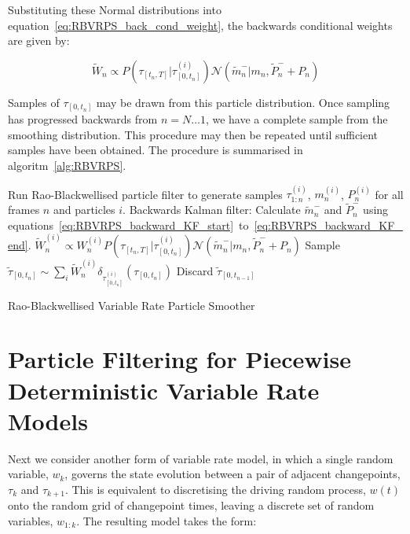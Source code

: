 \documentclass[a4paper,10pt]{article}
\begin{document}
Substituting these Normal distributions into equation~\ref{eq:RBVRPS_back_cond_weight}, the backwards conditional weights are given by:

\begin{equation}
 \tilde{W}_n \propto P(\tau_{[t_n,T]}|\tau_{[0,t_n]}^{(i)}) \mathcal{N}(\tilde{m}_n^-|m_n, \tilde{P}_n^- + P_n)
\label{eq:RBVRPS_back_cond_weight2}
\end{equation}

Samples of $\tau_{[0,t_n]}$ may be drawn from this particle distribution. Once sampling has progressed backwards from $n=N \dots 1$, we have a complete sample from the smoothing distribution. This procedure may then be repeated until sufficient samples have been obtained. The procedure is summarised in algoritm~\ref{alg:RBVRPS}.

\begin{algorithm}
 \begin{algorithmic}
  \STATE Run Rao-Blackwellised particle filter to generate samples $\tau_{1:n}^{(i)}$, $m_n^{(i)}$, $P_n^{(i)}$ for all frames $n$ and particles $i$.
      \STATE Backwards Kalman filter: Calculate $\tilde{m}_n^-$ and $\tilde{P}_n^-$ using equations~\ref{eq:RBVRPS_backward_KF_start}~to~\ref{eq:RBVRPS_backward_KF_end}.
	\STATE $\tilde{W}_n^{(i)} \propto W_n^{(i)} P(\tau_{[t_n,T]}|\tau_{[0,t_n]}^{(i)}) \mathcal{N}(\tilde{m}_n^-|m_n, \tilde{P}_n^- + P_n)$
      \ENDFOR
      \STATE Sample $\tilde{\tau}_{[0,t_n]} \sim \sum_i \tilde{W}_n^{(i)} \delta_{\tau_{[0,t_n]}^{(i)}}(\tau_{[0,t_n]})$
      \STATE Discard $\tilde{\tau}_{[0,t_{n-1}]}$
    \ENDFOR
  \ENDFOR
 \end{algorithmic}
\caption{Rao-Blackwellised Variable Rate Particle Smoother}
\label{alg:RBVRPS}
\end{algorithm}



\section{Particle Filtering for Piecewise Deterministic Variable Rate Models}
Next we consider another form of variable rate model, in which a single random variable, $w_k$, governs the state evolution between a pair of adjacent changepoints, $\tau_k$ and $\tau_{k+1}$. This is equivalent to discretising the driving random process, $w(t)$ onto the random grid of changepoint times, leaving a discrete set of random variables, $w_{1:k}$. The resulting model takes the form:
\end{document}
